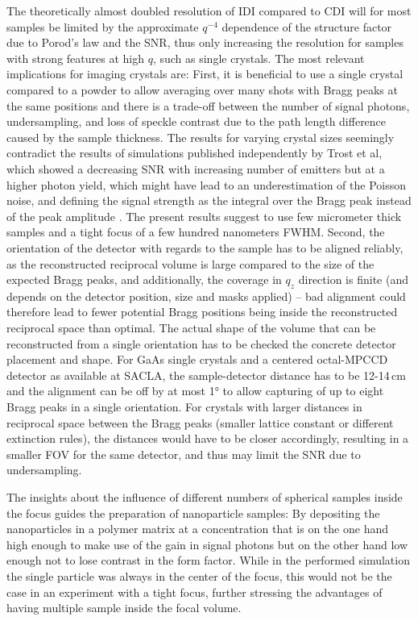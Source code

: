 The theoretically almost doubled resolution of IDI compared to CDI will for most samples be limited by the approximate $q^{-4}$ dependence of the structure factor due to Porod's law and the SNR, thus only increasing the resolution for samples with strong features at high $q$, such as single crystals.
The most relevant implications for imaging crystals are: First, it is beneficial to use a single crystal compared to a powder to allow averaging over many shots with Bragg peaks at the same positions and there is a trade-off between the number of signal photons, undersampling, and loss of speckle contrast due to the path length difference caused by the sample thickness. The results for varying crystal sizes seemingly contradict the results of simulations published independently by Trost et al, which showed a decreasing SNR with increasing number of emitters but at a higher photon yield, which might have lead to an underestimation of the Poisson noise, and defining the signal strength as the integral over the Bragg peak instead of the peak amplitude \cite{trost2020}. The present results suggest to use few micrometer thick samples and a tight focus of a few hundred nanometers FWHM. Second, the orientation of the detector with regards to the sample has to be aligned reliably, as the reconstructed reciprocal volume is large compared to the size of the expected Bragg peaks, and additionally, the coverage in $q_z$ direction is finite (and depends on the detector position, size and masks applied) -- bad alignment could therefore lead to fewer potential Bragg positions being inside the reconstructed reciprocal space than optimal. The actual shape of the volume that can be reconstructed from a single orientation has to be checked the concrete detector placement and shape.  For GaAs single crystals and a centered octal-MPCCD detector as available at SACLA, the sample-detector distance has to be 12-14\,cm and the alignment can be off by at most 1° to allow capturing of up to eight Bragg peaks in a single orientation. For crystals with larger distances in reciprocal space between the Bragg peaks (smaller lattice constant or different extinction rules), the distances would have to be closer accordingly, resulting in a smaller FOV for the same detector, and thus may limit the SNR due to undersampling.

The insights about the influence of different numbers of spherical samples inside the focus guides the preparation of nanoparticle samples: By depositing the nanoparticles in a polymer matrix at a concentration that is on the one hand high enough to make use of the gain in signal photons but on the other hand low enough not to lose contrast in the form factor. While in the performed simulation the single particle was always in the center of the focus, this would not be the case in an experiment with a tight focus, further stressing the advantages of having multiple sample inside the focal volume.


